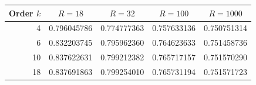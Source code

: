 \begin{tabular}{@{}rcccc@{}}
\toprule
Order $k$ & $R=18$ & $R=32$ & $R=100$ & $R=1000$\\
\midrule
4 & 0.796045786 & 0.774777363 & 0.757633136 & 0.750751314\\
6 & 0.832203745 & 0.795962360 & 0.764623633 & 0.751458736\\
10 & 0.837622631 & 0.799212382 & 0.765717157 & 0.751570290\\
18 & 0.837691863 & 0.799254010 & 0.765731194 & 0.751571723\\
\bottomrule
\end{tabular}
